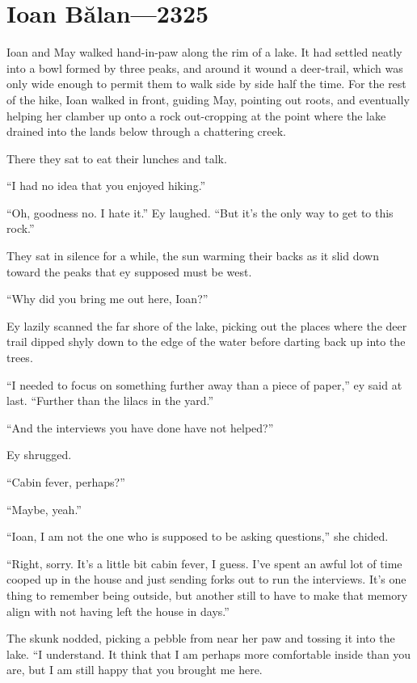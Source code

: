 \hypertarget{ioan-bux103lan-2325}{%
\chapter{Ioan Bălan---2325}\label{ioan-bux103lan-2325}}

Ioan and May walked hand-in-paw along the rim of a lake. It had settled neatly into a bowl formed by three peaks, and around it wound a deer-trail, which was only wide enough to permit them to walk side by side half the time. For the rest of the hike, Ioan walked in front, guiding May, pointing out roots, and eventually helping her clamber up onto a rock out-cropping at the point where the lake drained into the lands below through a chattering creek.

There they sat to eat their lunches and talk.

``I had no idea that you enjoyed hiking.''

``Oh, goodness no. I hate it.'' Ey laughed. ``But it's the only way to get to this rock.''

They sat in silence for a while, the sun warming their backs as it slid down toward the peaks that ey supposed must be west.

``Why did you bring me out here, Ioan?''

Ey lazily scanned the far shore of the lake, picking out the places where the deer trail dipped shyly down to the edge of the water before darting back up into the trees.

``I needed to focus on something further away than a piece of paper,'' ey said at last. ``Further than the lilacs in the yard.''

``And the interviews you have done have not helped?''

Ey shrugged.

``Cabin fever, perhaps?''

``Maybe, yeah.''

``Ioan, I am not the one who is supposed to be asking questions,'' she chided.

``Right, sorry. It's a little bit cabin fever, I guess. I've spent an awful lot of time cooped up in the house and just sending forks out to run the interviews. It's one thing to remember being outside, but another still to have to make that memory align with not having left the house in days.''

The skunk nodded, picking a pebble from near her paw and tossing it into the lake. ``I understand. It think that I am perhaps more comfortable inside than you are, but I am still happy that you brought me here.

